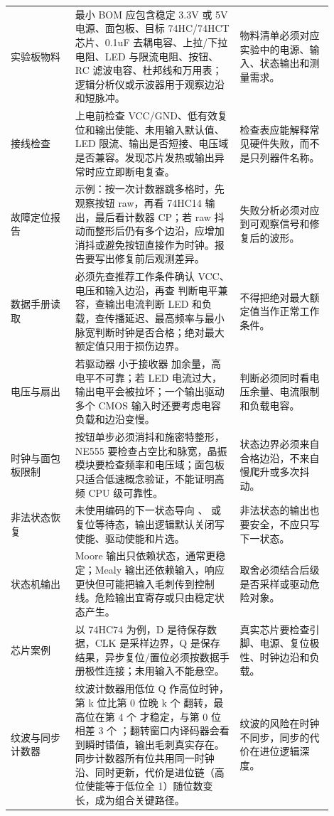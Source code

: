 \begin{longtable}{L{0.18\linewidth}L{0.46\linewidth}L{0.26\linewidth}}
实验板物料 & 最小 BOM 应包含稳定 3.3V 或 5V 电源、面包板、目标 74HC/74HCT 芯片、0.1uF 去耦电容、上拉/下拉电阻、LED 与限流电阻、按钮、RC 滤波电容、杜邦线和万用表；逻辑分析仪或示波器用于观察边沿和短脉冲。 & 物料清单必须对应实验中的电源、输入、状态输出和测量需求。 \\
接线检查 & 上电前检查 VCC/GND、低有效复位和输出使能、未用输入默认值、LED 限流、输出是否短接、电压域是否兼容。发现芯片发热或输出异常时应立即断电复查。 & 检查表应能解释常见硬件失败，而不是只列器件名称。 \\
故障定位报告 & 示例：按一次计数器跳多格时，先观察按钮 raw，再看 74HC14 输出，最后看计数器 CP；若 raw 抖动而整形后仍有多个边沿，应增加消抖或避免按钮直接作为时钟。报告要写出修复前后观测差异。 & 失败分析必须对应到可观察信号和修复后的波形。 \\
数据手册读取 & 必须先查推荐工作条件确认 VCC、电压和输入边沿，再查  判断电平兼容，查输出电流判断 LED 和负载，查传播延迟、最高频率与最小脉宽判断时钟是否合格；绝对最大额定值只用于损伤边界。 & 不得把绝对最大额定值当作正常工作条件。 \\
电压与扇出 & 若驱动器  小于接收器  加余量，高电平不可靠；若 LED 电流过大，输出电平会被拉坏；一个输出驱动多个 CMOS 输入时还要考虑电容负载和边沿变慢。 & 判断必须同时看电压余量、电流限制和负载电容。 \\
时钟与面包板限制 & 按钮单步必须消抖和施密特整形，NE555 要检查占空比和脉宽，晶振模块要检查频率和电压域；面包板只适合低速概念验证，不能证明高频 CPU 级可靠性。 & 状态边界必须来自合格边沿，不来自慢爬升或多次抖动。 \\
非法状态恢复 & 未使用编码的下一状态导向 、 或复位等待态，输出逻辑默认关闭写使能、驱动使能和片选。 & 非法状态的输出也要安全，不应只写下一状态。 \\
状态机输出 & Moore 输出只依赖状态，通常更稳定；Mealy 输出还依赖输入，响应更快但可能把输入毛刺传到控制线。危险输出宜寄存或只由稳定状态产生。 & 取舍必须结合后级是否采样或驱动危险对象。 \\
芯片案例 & 以 74HC74 为例，D 是待保存数据，CLK 是采样边界，Q 是保存结果，异步复位/置位必须按数据手册极性连接；未用输入不能悬空。 & 真实芯片要检查引脚、电源、复位极性、时钟边沿和负载。 \\
纹波与同步计数器 & 纹波计数器用低位 Q 作高位时钟，第 k 位比第 0 位晚 k 个  翻转，最高位在第 4 个  才稳定，与第 0 位相差 3 个 ；翻转窗口内译码器会看到瞬时错值，输出毛刺真实存在。同步计数器所有位共用同一时钟沿、同时更新，代价是进位链（高位使能等于低位全 1）随位数变长，成为组合关键路径。 & 纹波的风险在时钟不同步，同步的代价在进位逻辑深度。 \\

\end{longtable}
